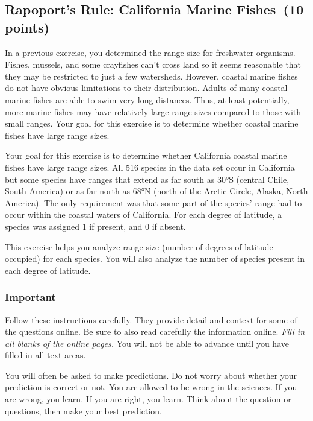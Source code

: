 \documentclass[11pt]{article}
\newcommand{\assignmentTitle}{Rapoport's Rule: California Marine Fishes}
\begin{document}
\thispagestyle{firstpage}

\subsection*{\assignmentTitle\ (10 points)}

In a previous exercise, you determined the range size for freshwater
organisms. Fishes, mussels, and some crayfishes can't cross land so it seems
reasonable that they may be restricted to just a few watersheds.
However, coastal marine fishes do not have obvious limitations to their
distribution. Adults of many coastal marine fishes are able to swim very
long distances. Thus, at least potentially, more marine fishes may have
relatively large range sizes compared to those with small ranges. Your
goal for this exercise is to determine whether coastal marine fishes
have large range sizes.

Your goal for this exercise is to determine whether California          coastal marine fishes have large range sizes. All 516 species in         the data set occur in California but some species have ranges that extend as far south as 30°S (central Chile, South America) or as far north as 68°N (north of the Arctic Circle, Alaska, North America). The only requirement was that some part of the species' range had to occur within the coastal waters of California. For each degree of         latitude, a species was assigned 1 if present, and 0 if absent.

This exercise helps you analyze range size (number of degrees of latitude occupied) for each species. You will also analyze the number of species present in each degree of latitude.

\subsubsection*{Important}

Follow these instructions carefully. They provide detail and context for some
of the questions online.  Be sure to also read carefully the 
information online.  \emph{Fill in all blanks of the online pages.} You will not be 
able to advance until you have filled in all text areas.

You will often be asked to make predictions. Do not worry about whether your
prediction is correct or not. You are allowed to be wrong in the sciences. If you are wrong,
you learn. If you are right, you learn.  Think about the question or questions, then make your
best prediction.
\end{document}
